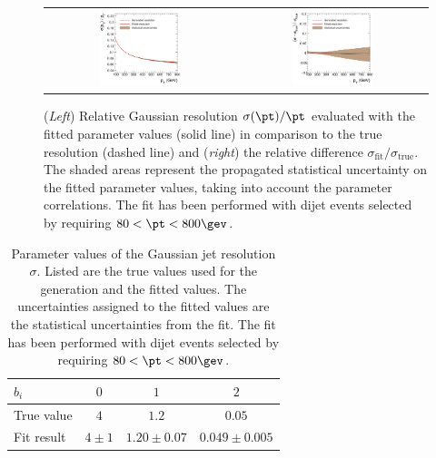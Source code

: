 \begin{figure}[ht]
  \centering
  \begin{tabular}{cc}
    \includegraphics[width=0.45\textwidth]{figures/resFit_ToyMC_PtCuts_Sigma} &
    \includegraphics[width=0.45\textwidth]{figures/resFit_ToyMC_PtCuts_SigmaRelDifference} \\
  \end{tabular}
  \caption{(\textit{Left}) Relative Gaussian resolution $\sigma(\pt)/\pt$ evaluated with the fitted
    parameter values (solid line) in comparison to the true resolution
    (dashed line) and (\textit{right}) the relative difference
    $\sigma_{\text{fit}} / \sigma_{\text{true}}$.
    The shaded areas represent the propagated statistical
    uncertainty on the fitted parameter values, taking into account the
    parameter correlations.
    The fit has been performed with dijet events selected by requiring \mbox{$80 < \pt < 800\gev$}.}
  \label{fig:ResFit:App:ToyMC:PtCuts:FittedSigma}
\end{figure}


\begin{table}[ht]
  \caption{Parameter values of the Gaussian jet \pt resolution
    $\sigma$.
    Listed are the true values used for the generation and
    the fitted values.
    The uncertainties assigned to the fitted values
    are the statistical uncertainties from the fit.
    The fit has been performed with dijet events selected by requiring
    \mbox{$80 < \pt < 800\gev$}.}
  \centering
  \begin{tabular}[ht]{lccc}
    \toprule
    $b_{i}$ & $0$ & $1$ & $2$ \\
    \midrule
    True value & $4$           & $1.2$                   & $0.05$ \\
    Fit result   & $4 \pm 1$ & $1.20 \pm 0.07$ & $0.049 \pm 0.005$ \\
    \bottomrule
   \end{tabular}
 \label{tab:ResFit:ToyMC:PtCuts:FitResult}
\end{table}


